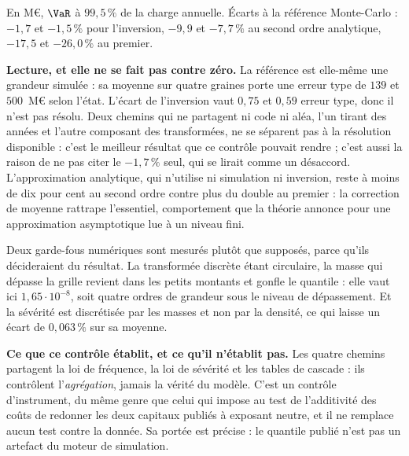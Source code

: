 \vspace{4pt}
\noindent En M\euro, $\VaR$ à $99{,}5\,\%$ de la charge annuelle. Écarts à la référence
Monte-Carlo : $-1{,}7$ et $-1{,}5\,\%$ pour l'inversion, $-9{,}9$ et $-7{,}7\,\%$ au second ordre
analytique, $-17{,}5$ et $-26{,}0\,\%$ au premier.

\textbf{Lecture, et elle ne se fait pas contre zéro.} La référence est elle-même une grandeur
simulée : sa moyenne sur quatre graines porte une erreur type de $139$ et $500$~M\euro{} selon
l'état. L'écart de l'inversion vaut $0{,}75$ et $0{,}59$ erreur type, donc il n'est pas
résolu. Deux chemins qui ne partagent ni code ni aléa, l'un tirant des années et l'autre
composant des transformées, ne se séparent pas à la résolution disponible : c'est le meilleur
résultat que ce contrôle pouvait rendre ; c'est aussi la raison de ne pas citer le $-1{,}7\,\%$
seul, qui se lirait comme un désaccord. L'approximation analytique, qui n'utilise ni simulation
ni inversion, reste à moins de dix pour cent au second ordre contre plus du double au premier :
la correction de moyenne rattrape l'essentiel, comportement que la théorie annonce pour une
approximation asymptotique lue à un niveau fini.

Deux garde-fous numériques sont mesurés plutôt que supposés, parce qu'ils décideraient du
résultat. La transformée discrète étant circulaire, la masse qui dépasse la grille revient dans
les petits montants et gonfle le quantile : elle vaut ici $1{,}65\cdot 10^{-8}$, soit quatre ordres
de grandeur sous le niveau de dépassement. Et la sévérité est discrétisée par les masses et non
par la densité, ce qui laisse un écart de $0{,}063\,\%$ sur sa moyenne.

\begin{cle}
\textbf{Ce que ce contrôle établit, et ce qu'il n'établit pas.} Les quatre chemins partagent la
loi de fréquence, la loi de sévérité et les tables de cascade : ils contrôlent
l'\emph{agrégation}, jamais la vérité du modèle. C'est un contrôle d'instrument, du même genre
que celui qui impose au test de l'additivité des coûts de redonner les deux capitaux publiés à
exposant neutre, et il ne remplace aucun test contre la donnée. Sa portée est précise : le
quantile publié n'est pas un artefact du moteur de simulation.
\end{cle}


